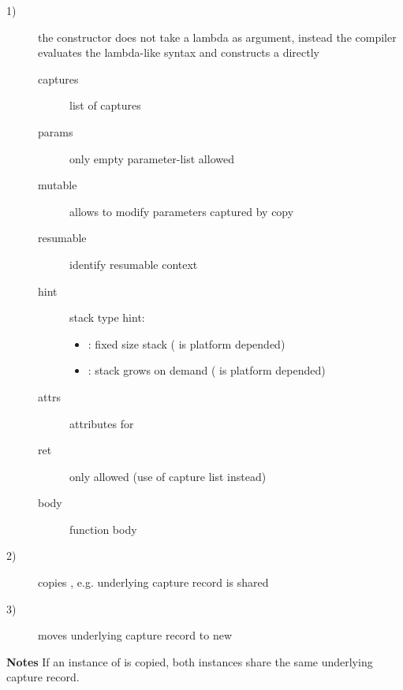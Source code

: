 \begin{description}
    \item[1)] the constructor does not take a lambda as argument, instead the
              compiler evaluates the lambda-like syntax and constructs a \ectx
              directly
              \begin{description}
                  \item[captures]     list of captures
                  \item[params]       only empty parameter-list allowed
                  \item[mutable]      allows to modify parameters captured by copy
                  \item[resumable]    identify resumable context
                  \item[hint]         stack type hint:
                                      \begin{itemize}
                                          \item {}:
                                              fixed size stack ( is
                                              platform depended)
                                          \item {}:
                                              stack grows on demand (
                                              is platform depended)
                                      \end{itemize}
                  \item[attrs]        attributes for 
                  \item[ret]          only  allowed
                                      (use of capture list instead)
                  \item[body]         function body\\
              \end{description}
    \item[2)] copies \ectx, e.g. underlying capture record is shared
    \item[3)] moves underlying capture record to new \ectx
\end{description}

{\bfseries Notes}
\newline
If an instance of \ectx is copied, both instances share the same underlying
capture record.

